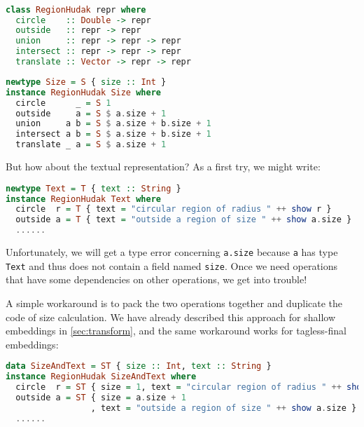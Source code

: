 \noindent
\begin{minipage}{0.48\textwidth}
\begin{lstlisting}[language=Haskell,deletekeywords={union,intersect}]

class RegionHudak repr where
  circle    :: Double -> repr
  outside   :: repr -> repr
  union     :: repr -> repr -> repr
  intersect :: repr -> repr -> repr
  translate :: Vector -> repr -> repr
\end{lstlisting}
\end{minipage}%
\begin{minipage}{0.52\textwidth}
\begin{lstlisting}[language=Haskell,deletekeywords={union,intersect}]
newtype Size = S { size :: Int }
instance RegionHudak Size where
  circle      _ = S 1
  outside     a = S $ a.size + 1
  union     a b = S $ a.size + b.size + 1
  intersect a b = S $ a.size + b.size + 1
  translate _ a = S $ a.size + 1
\end{lstlisting}
\end{minipage}

\noindent
But how about the textual representation? As a first try, we might write:

\begin{lstlisting}[language=Haskell]
newtype Text = T { text :: String }
instance RegionHudak Text where
  circle  r = T { text = "circular region of radius " ++ show r }
  outside a = T { text = "outside a region of size " ++ show a.size }
  ......
\end{lstlisting}

\noindent
Unfortunately, we will get a type error concerning \lstinline{a.size} because
\lstinline{a} has type \lstinline{Text} and thus does not contain a field named
\lstinline{size}. Once we need operations that have some dependencies on other
operations, we get into trouble!

A simple workaround is to pack the two operations together and duplicate the
code of size calculation. We have already described this approach for shallow
embeddings in \autoref{sec:transform}, and the same workaround works for
tagless-final embeddings:

\begin{lstlisting}[language=Haskell,deletekeywords={union,intersect}]
data SizeAndText = ST { size :: Int, text :: String }
instance RegionHudak SizeAndText where
  circle  r = ST { size = 1, text = "circular region of radius " ++ show r }
  outside a = ST { size = a.size + 1
                 , text = "outside a region of size " ++ show a.size }
  ......
\end{lstlisting}

